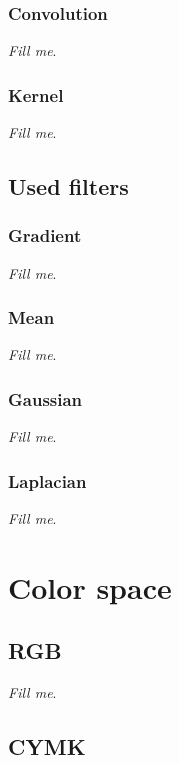 \documentclass{report}
\begin{document}
		\subsubsection{Convolution}

			\textit{Fill me}.

		\subsubsection{Kernel}

			\textit{Fill me}.

	\subsection{Used filters}
		
		\subsubsection{Gradient}

			\textit{Fill me}.
		
		\subsubsection{Mean}

			\textit{Fill me}.

		\subsubsection{Gaussian}

			\textit{Fill me}.

		\subsubsection{Laplacian}

			\textit{Fill me}.

\section{Color space}          

	\subsection{RGB}
		
		\textit{Fill me}.

	\subsection{CYMK}
\end{document}
